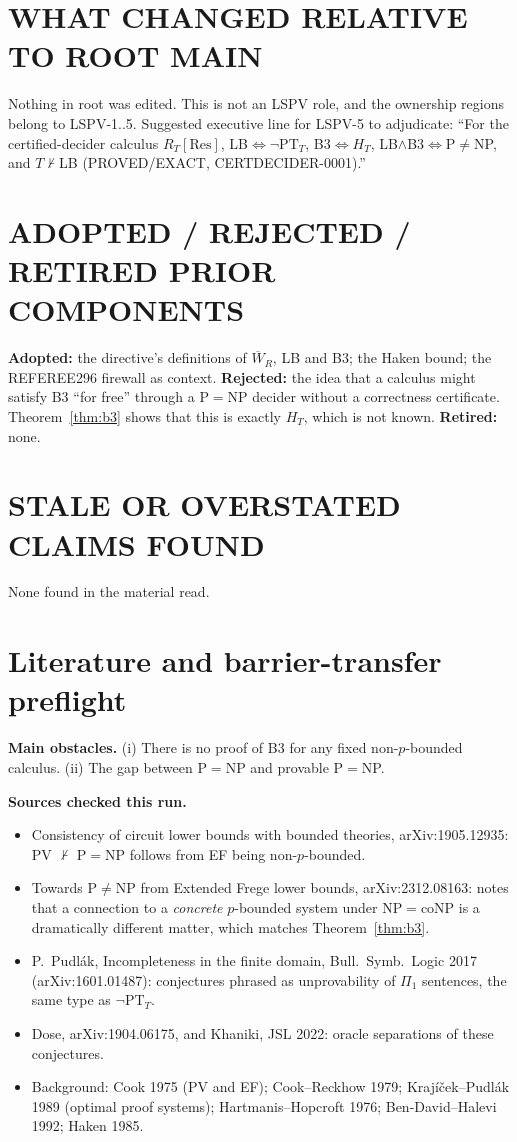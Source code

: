 \documentclass[11pt]{article}
\newcommand{\Wb}{\overline W}
\newcommand{\PT}{\mathrm{PT}}
\begin{document}
\section{WHAT CHANGED RELATIVE TO ROOT MAIN}
Nothing in root  was edited. This is not an LSPV role, and the ownership
regions belong to LSPV-1..5. Suggested executive line for LSPV-5 to adjudicate:
``For the certified-decider calculus $R_T[\mathrm{Res}]$, LB$\iff\neg\PT_T$,
B3$\iff H_T$, LB$\wedge$B3$\iff$P$\neq$NP, and $T\nvdash$LB (PROVED/EXACT, CERTDECIDER-0001).''

\section{ADOPTED / REJECTED / RETIRED PRIOR COMPONENTS}
\textbf{Adopted:} the directive's definitions of $\Wb_R$, LB and B3; the Haken bound; the
REFEREE296 firewall as context.
\textbf{Rejected:} the idea that a calculus might satisfy B3 ``for free'' through a P$=$NP
decider without a correctness certificate. Theorem~\ref{thm:b3} shows that this is exactly
$H_T$, which is not known.
\textbf{Retired:} none.

\section{STALE OR OVERSTATED CLAIMS FOUND}
None found in the material read.

\section{Literature and barrier-transfer preflight}
\textbf{Main obstacles.} (i) There is no proof of B3 for any fixed non-$p$-bounded calculus.
(ii) The gap between P$=$NP and provable P$=$NP.

\textbf{Sources checked this run.}
\begin{itemize}
\item Consistency of circuit lower bounds with bounded theories, arXiv:1905.12935: PV
$\nvdash$ P$=$NP follows from EF being non-$p$-bounded.
\item Towards P$\neq$NP from Extended Frege lower bounds, arXiv:2312.08163: notes that a
connection to a \emph{concrete} $p$-bounded system under NP$=$coNP is a dramatically
different matter, which matches Theorem~\ref{thm:b3}.
\item P.~Pudl\'ak, Incompleteness in the finite domain, Bull.\ Symb.\ Logic 2017
(arXiv:1601.01487): conjectures phrased as unprovability of $\Pi_1$ sentences, the same
type as $\neg\PT_T$.
\item Dose, arXiv:1904.06175, and Khaniki, JSL 2022: oracle separations of these
conjectures.
\item Background: Cook 1975 (PV and EF); Cook--Reckhow 1979; Krajíček--Pudl\'ak 1989
(optimal proof systems); Hartmanis--Hopcroft 1976; Ben-David--Halevi 1992; Haken 1985.
\end{itemize}
\end{document}

